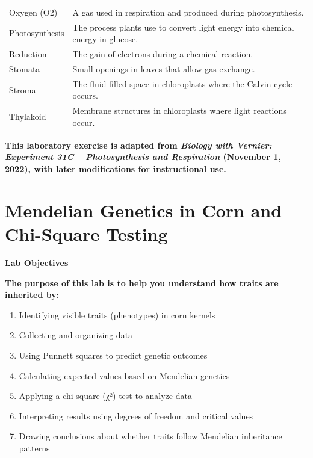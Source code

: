 \documentclass[
  letterpaper,
  DIV=11,
  numbers=noendperiod]{scrreprt}
\begin{document}
{\begin{longtable}[]{@{}
  >{\raggedright\arraybackslash}p{}
  >{\raggedright\arraybackslash}p{}@{}}
Oxygen (O2) & A gas used in respiration and produced during
photosynthesis. \\
Photosynthesis & The process plants use to convert light energy into
chemical energy in glucose. \\
Reduction & The gain of electrons during a chemical reaction. \\
Stomata & Small openings in leaves that allow gas exchange. \\
Stroma & The fluid-filled space in chloroplasts where the Calvin cycle
occurs. \\
Thylakoid & Membrane structures in chloroplasts where light reactions
occur. \\
\end{longtable}
}

\textbf{This laboratory exercise is adapted from \emph{Biology with
Vernier: Experiment 31C -- Photosynthesis and Respiration} (November 1,
2022), with later modifications for instructional use.}


\chapter{\texorpdfstring{\textbf{Mendelian Genetics in Corn and
Chi-Square
Testing}}{Mendelian Genetics in Corn and Chi-Square Testing}}\label{mendelian-genetics-in-corn-and-chi-square-testing}

\textbf{Lab Objectives}

\textbf{The purpose of this lab is to help you understand how traits are
inherited by:}

\begin{enumerate}
\def\labelenumi{\arabic{enumi}.}
\item
  Identifying visible traits (phenotypes) in corn kernels
\item
  Collecting and organizing data
\item
  Using Punnett squares to predict genetic outcomes
\item
  Calculating expected values based on Mendelian genetics
\item
  Applying a chi-square (χ²) test to analyze data
\item
  Interpreting results using degrees of freedom and critical values
\item
  Drawing conclusions about whether traits follow Mendelian inheritance
  patterns
\end{enumerate}
\end{document}
